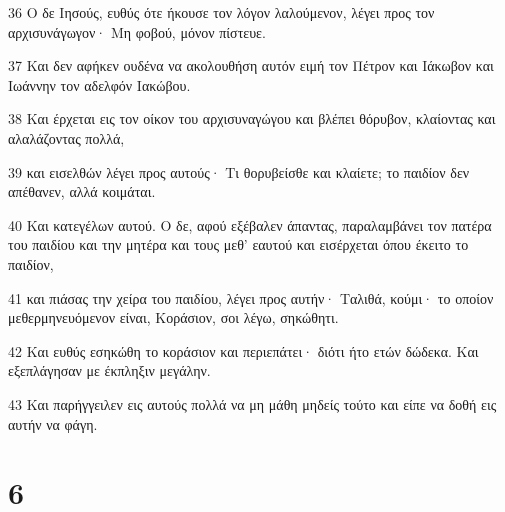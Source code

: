 \par 36 Ο δε Ιησούς, ευθύς ότε ήκουσε τον λόγον λαλούμενον, λέγει προς τον αρχισυνάγωγον· Μη φοβού, μόνον πίστευε.
\par 37 Και δεν αφήκεν ουδένα να ακολουθήση αυτόν ειμή τον Πέτρον και Ιάκωβον και Ιωάννην τον αδελφόν Ιακώβου.
\par 38 Και έρχεται εις τον οίκον του αρχισυναγώγου και βλέπει θόρυβον, κλαίοντας και αλαλάζοντας πολλά,
\par 39 και εισελθών λέγει προς αυτούς· Τι θορυβείσθε και κλαίετε; το παιδίον δεν απέθανεν, αλλά κοιμάται.
\par 40 Και κατεγέλων αυτού. Ο δε, αφού εξέβαλεν άπαντας, παραλαμβάνει τον πατέρα του παιδίου και την μητέρα και τους μεθ' εαυτού και εισέρχεται όπου έκειτο το παιδίον,
\par 41 και πιάσας την χείρα του παιδίου, λέγει προς αυτήν· Ταλιθά, κούμι· το οποίον μεθερμηνευόμενον είναι, Κοράσιον, σοι λέγω, σηκώθητι.
\par 42 Και ευθύς εσηκώθη το κοράσιον και περιεπάτει· διότι ήτο ετών δώδεκα. Και εξεπλάγησαν με έκπληξιν μεγάλην.
\par 43 Και παρήγγειλεν εις αυτούς πολλά να μη μάθη μηδείς τούτο και είπε να δοθή εις αυτήν να φάγη.

\chapter{6}

